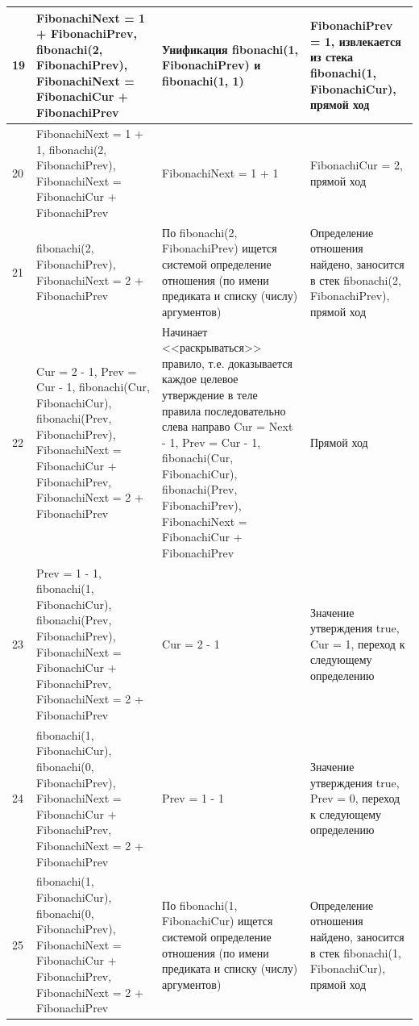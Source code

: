 \documentclass[a4paper,14pt]{extreport} %
\begin{document}
\begin{longtable}{|p{0.5cm}|p{5cm}|p{6cm}|p{5.5cm}|}
	19 & FibonachiNext = 1 + FibonachiPrev, fibonachi(2, FibonachiPrev), FibonachiNext = FibonachiCur + FibonachiPrev  & Унификация fibonachi(1, FibonachiPrev) и fibonachi(1, 1) & FibonachiPrev = 1, извлекается из стека fibonachi(1, FibonachiCur), прямой ход \\ \hline
	
	20 & FibonachiNext = 1 + 1, fibonachi(2, FibonachiPrev), FibonachiNext = FibonachiCur + FibonachiPrev  & FibonachiNext = 1 + 1 & FibonachiCur = 2, прямой ход \\ \hline
	
	21 & fibonachi(2, FibonachiPrev), FibonachiNext = 2 + FibonachiPrev  & По fibonachi(2, FibonachiPrev) ищется системой определение отношения (по имени предиката и списку (числу) аргументов) & Определение отношения найдено, заносится в стек fibonachi(2, FibonachiPrev), прямой ход \\ \hline	
	
	22 & Cur = 2 - 1, Prev = Cur - 1, fibonachi(Cur, FibonachiCur), fibonachi(Prev, FibonachiPrev), FibonachiNext = FibonachiCur + FibonachiPrev, FibonachiNext = 2 + FibonachiPrev &  Начинает <<раскрываться>> правило, т.е. доказывается каждое целевое утверждение в теле правила последовательно слева направо
	Cur = Next - 1, Prev = Cur - 1, fibonachi(Cur, FibonachiCur), fibonachi(Prev, FibonachiPrev), FibonachiNext = FibonachiCur + FibonachiPrev & Прямой ход\\ \hline
	
	23 & Prev = 1 - 1, fibonachi(1, FibonachiCur), fibonachi(Prev, FibonachiPrev), FibonachiNext = FibonachiCur + FibonachiPrev, FibonachiNext = 2 + FibonachiPrev    & Cur = 2 - 1	
	& Значение утверждения true, Cur = 1, переход к следующему определению\\ \hline
	
	24 & fibonachi(1, FibonachiCur), fibonachi(0, FibonachiPrev), FibonachiNext = FibonachiCur + FibonachiPrev, FibonachiNext = 2 + FibonachiPrev   & Prev = 1 - 1	
	& Значение утверждения true, Prev = 0, переход к следующему определению\\ \hline
	
	25 & fibonachi(1, FibonachiCur), fibonachi(0, FibonachiPrev), FibonachiNext = FibonachiCur + FibonachiPrev, FibonachiNext = 2 + FibonachiPrev  & По fibonachi(1, FibonachiCur) ищется системой определение отношения (по имени предиката и списку (числу) аргументов) & Определение отношения найдено, заносится в стек fibonachi(1, FibonachiCur), прямой ход \\ \hline
	

\end{longtable}
\end{document}
